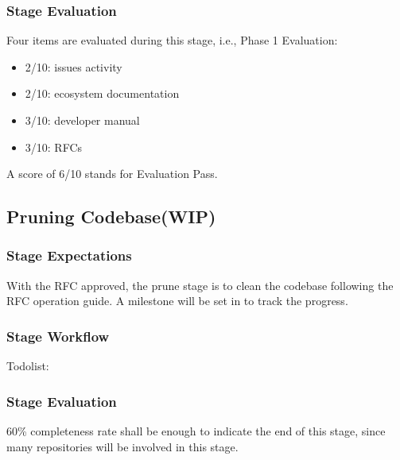 \subsubsection*{Stage Evaluation}

Four items are evaluated during this stage, i.e., \textsf{Phase 1 Evaluation}:
\begin{itemize}
    \item 2/10: issues activity
    \item 2/10: ecosystem documentation
    \item 3/10: developer manual
    \item 3/10: RFCs
\end{itemize}
A score of 6/10 stands for \textsf{Evaluation Pass}.

\subsection{Pruning Codebase(WIP)}\label{subsec:prune}

\subsubsection*{Stage Expectations}
With the RFC approved, the prune stage is to clean the codebase following the RFC operation guide. A milestone will be set in \repoimages{} to track the progress.

\subsubsection*{Stage Workflow}

Todolist:





\subsubsection*{Stage Evaluation}
60\% completeness rate shall be enough to indicate the end of this stage, since many repositories will be involved in this stage.
